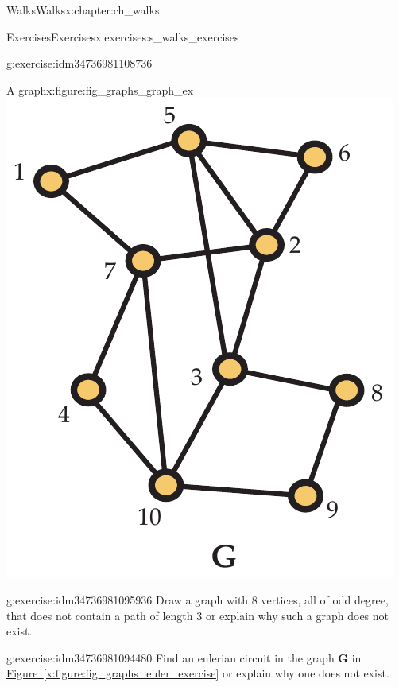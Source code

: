 \documentclass[oneside,10pt,]{book}
\newcommand{\xreffont}{\relax}
\numberwithin{equation}{section}
\newcommand{\bfG}{\mathbf{G}}
\begin{document}
\begin{chapterptx}{Walks}{}{Walks}{}{}{x:chapter:ch_walks}
\begin{exercises-section}{Exercises}{}{Exercises}{}{}{x:exercises:s_walks_exercises}
\begin{divisionexercise}{1}{}{}{g:exercise:idm34736981108736}
\begin{sidebyside}{2}{0.0125}{0.0125}{0.025}
\begin{sbspanel}{0.6}
\begin{enumerate}[label=(\alph*)]
\end{enumerate}
\end{sbspanel}%
\begin{sbspanel}{0.35}%
\begin{figureptx}{A graph}{x:figure:fig_graphs_graph_ex}{}%
\includegraphics[width=\linewidth]{images/graph_ex}
\tcblower
\end{figureptx}%
\end{sbspanel}%
\end{sidebyside}%
\end{divisionexercise}%
\begin{divisionexercise}{2}{}{}{g:exercise:idm34736981095936}%
Draw a graph with \(8\) vertices, all of odd degree, that does not contain a path of length \(3\) or explain why such a graph does not exist.%
\end{divisionexercise}%
\begin{divisionexercise}{3}{}{}{g:exercise:idm34736981094480}%
Find an eulerian circuit in the graph \(\bfG\) in \hyperref[x:figure:fig_graphs_euler_exercise]{Figure~{\xreffont\ref{x:figure:fig_graphs_euler_exercise}}} or explain why one does not exist.%

\end{divisionexercise}
\end{exercises-section}
\end{chapterptx}
\end{document}
